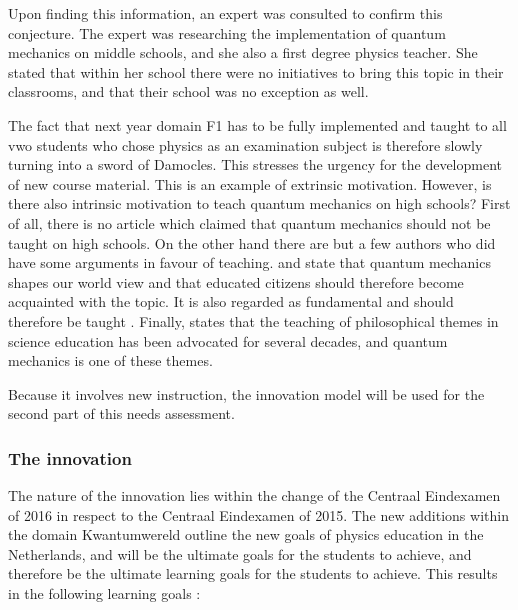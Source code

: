 \documentclass[11pt,twoside]{report} %
\begin{document}
Upon finding this information, an expert was consulted to confirm this conjecture. The expert was researching the implementation of quantum mechanics on middle schools, and she also a first degree physics teacher. She stated that within her school there were no initiatives to bring this topic in their classrooms, and that their school was no exception as well.

The fact that next year domain F1 has to be fully implemented and taught to all vwo students who chose physics as an examination subject is therefore slowly turning into a sword of Damocles. This stresses the urgency for the development of new course material. This is an example of extrinsic motivation. However, is there also intrinsic motivation to teach quantum mechanics on high schools? First of all, there is no article which claimed that quantum mechanics should not be taught on high schools. On the other hand there are but a few authors who did have some arguments in favour of teaching.  and  state that quantum mechanics shapes our world view and that educated citizens should therefore become acquainted with the topic. It is also regarded as fundamental and should therefore be taught \cite{henriksen,hobson}. Finally,  states that the teaching of philosophical themes in science education has been advocated for several decades, and quantum mechanics is one of these themes.

Because it involves new instruction, the innovation model will be used for the second part of this needs assessment.

\subsubsection{The innovation}

The nature of the innovation lies within the change of the Centraal Eindexamen of 2016 in respect to the Centraal Eindexamen of 2015. The new additions within the domain Kwantumwereld outline the new goals of physics education in the Netherlands, and will be the ultimate goals for the students to achieve, and therefore be the ultimate learning goals for the students to achieve. This results in the following learning goals \cite{eindexamen2016}:
\end{document}
